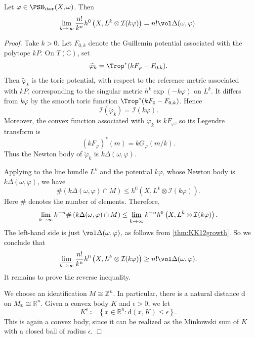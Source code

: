 \begin{corollary}\label{cor:DXmaintoric}
    Let $\varphi\in \PSH_{\tor}(X,\omega)$. Then
    \[
    \lim_{k\to\infty}\frac{n!}{k^n}h^0\left(X,L^k\otimes \mathcal{I}(k\varphi)\right)= n!\vol \Delta(\omega,\varphi).
    \]
\end{corollary}
\begin{proof}
    Take $k>0$. Let $F_{0,k}$ denote the Guillemin potential associated with the polytope $kP$. On $T(\mathbb C)$, set
    \[
        \widetilde\varphi_k=\Trop^*(kF_\varphi-F_{0,k}).
    \]
    Then $\widetilde\varphi_k$ is the toric potential, with respect to the reference metric associated with $kP$, corresponding to the singular metric $h^k\exp(-k\varphi)$ on $L^k$. It differs from $k\varphi$ by the smooth toric function $\Trop^*(kF_0-F_{0,k})$. Hence
    \[
        \mathcal I(\widetilde\varphi_k)=\mathcal I(k\varphi).
    \]
    Moreover, the convex function associated with $\widetilde\varphi_k$ is $kF_\varphi$, so its Legendre transform is
    \[
        (kF_\varphi)^*(m)=kG_\varphi(m/k).
    \]
    Thus the Newton body of $\widetilde\varphi_k$ is $k\Delta(\omega,\varphi)$.

    Applying  to the line bundle $L^k$ and the potential $k\varphi$, whose Newton body is $k\Delta(\omega,\varphi)$, we have
    \[
    \# \left( k\Delta(\omega,\varphi)\cap M\right)\leq h^0\left(X,L^k\otimes \mathcal{I}(k\varphi)\right).
    \]
    Here $\#$ denotes the number of elements. Therefore,
    \[
    \lim_{k\to\infty}k^{-n}\#\left( k\Delta(\omega,\varphi)\cap M\right)\leq \varliminf_{k\to\infty} k^{-n} h^0\left(X,L^k\otimes \mathcal{I}(k\varphi)\right).
    \]
    The left-hand side is just $\vol \Delta(\omega,\varphi)$, as follows from \cref{thm:KK12growth}. So we conclude that
    \[
    \varliminf_{k\to\infty}\frac{n!}{k^n}h^0\left(X,L^k\otimes \mathcal{I}(k\varphi)\right)\geq n!\vol \Delta(\omega,\varphi).
    \]
    It remains to prove the reverse inequality.

    We choose an identification $M\cong \mathbb{Z}^n$. In particular, there is a natural distance $\mathrm{d}$ on $M_{\mathbb{R}}\cong \mathbb{R}^n$.
    Given a convex body $K$ and $\epsilon>0$, we let
    \[
    K^{\epsilon}\coloneqq \left\{x\in \mathbb{R}^n: \mathrm{d}(x,K)\leq \epsilon \right\}.
    \]
    This is again a convex body, since it can be realized as the Minkowski sum of $K$ with a closed ball of radius $\epsilon$.


\end{proof}
